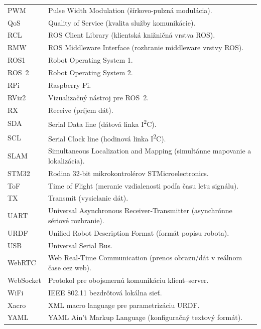 \begin{longtable}{p{}p{}}
    PWM & Pulse Width Modulation (šírkovo-pulzná modulácia).\\
    QoS & Quality of Service (kvalita služby komunikácie).\\
    RCL & ROS Client Library (klientská knižničná vrstva ROS).\\
    RMW & ROS Middleware Interface (rozhranie middleware vrstvy ROS).\\
    ROS1 & Robot Operating System 1.\\
    ROS~2 & Robot Operating System 2.\\
    RPi & Raspberry Pi.\\
    RViz2 & Vizualizačný nástroj pre ROS~2.\\
    RX & Receive (príjem dát).\\
    SDA & Serial Data line (dátová linka I\textsuperscript{2}C).\\
    SCL & Serial Clock line (hodinová linka I\textsuperscript{2}C).\\
    SLAM & Simultaneous Localization and Mapping (simultánne mapovanie a lokalizácia).\\
    STM32 & Rodina 32-bit mikrokontrolérov STMicroelectronics.\\
    ToF & Time of Flight (meranie vzdialenosti podľa času letu signálu).\\
    TX & Transmit (vysielanie dát).\\
    UART & Universal Asynchronous Receiver-Transmitter (asynchrónne sériové rozhranie).\\
    URDF & Unified Robot Description Format (formát popisu robota).\\
    USB & Universal Serial Bus.\\
    WebRTC & Web Real-Time Communication (prenos obrazu/dát v reálnom čase cez web).\\
    WebSocket & Protokol pre obojsmernú komunikáciu klient--server.\\
    WiFi & IEEE 802.11 bezdrôtová lokálna sieť.\\
    Xacro & XML macro language pre parametrizáciu URDF.\\
    YAML & YAML Ain't Markup Language (konfiguračný textový formát).\\
  \end{longtable}


  \ifODSAZ
    \setlength{\parskip}{0.5\bigskipamount}
  \else
    \setlength{\parskip}{0pt}
  \fi

  \iftwoside
    \cleardoublepage
  \fi

